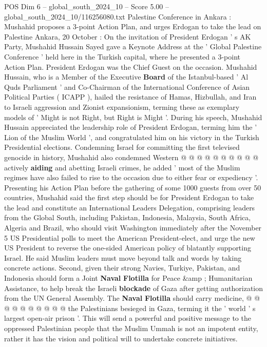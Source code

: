 \begin{textsample}{POS Dim 6 – global\_south\_2024\_10 – Score 5.00 – global\_south\_2024\_10/116256080.txt}  \label{ex:f6_pos_417}
Palestine Conference in Ankara : Mushahid proposes a 3-point Action Plan, and urges Erdogan to take the lead on Palestine Ankara, 20 October : On the invitation of President Erdogan ' s AK Party, Mushahid Hussain Sayed gave a Keynote Address at the ' Global Palestine Conference ' held here in the Turkish capital, where he presented a 3-point Action Plan.
President Erdogan was the Chief Guest on the occasion.
Mushahid Hussain, who is a Member of the Executive \textbf{Board} of the Istanbul-based ' Al Quds Parliament ' and Co-Chairman of the International Conference of Asian Political Parties ( ICAPP ), hailed the resistance of Hamas, Hizbullah, and Iran to Israeli aggression and Zionist expansionism, terming these as exemplary models of ' Might is not Right, but Right is Might '.
During his speech, Mushahid Hussain appreciated the leadership role of President Erdogan, terming him the ' Lion of the Muslim World ', and congratulated him on his victory in the Turkish Presidential elections.
Condemning Israel for committing the first televised genocide in history, Mushahid also condemned Western @ @ @ @ @ @ @ @ @ @ actively \textbf{aiding} and abetting Israeli crimes, he added ' most of the Muslim regimes have also failed to rise to the occasion due to either fear or expediency '.
Presenting his Action Plan before the gathering of some 1000 guests from over 50 countries, Mushahid said the first step should be for President Erdogan to take the lead and constitute an International Leaders Delegation, comprising leaders from the Global South, including Pakistan, Indonesia, Malaysia, South Africa, Algeria and Brazil, who should visit Washington immediately after the November 5 US Presidential polls to meet the American President-elect, and urge the new US President to reverse the one-sided American policy of blatantly supporting Israel.
He said Muslim leaders must move beyond talk and words by taking concrete actions.
Second, given their strong Navies, Turkiye, Pakistan, and Indonesia should form a Joint \textbf{Naval} \textbf{Flotilla} for Peace \&amp ; Humanitarian Assistance, to help break the Israeli \textbf{blockade} of Gaza after getting authorization from the UN General Assembly.
The \textbf{Naval} \textbf{Flotilla} should carry medicine, @ @ @ @ @ @ @ @ @ @ the Palestinians besieged in Gaza, terming it the ' world ' s largest open-air prison '.
This will send a powerful and positive message to the oppressed Palestinian people that the Muslim Ummah is not an impotent entity, rather it has the vision and political will to undertake concrete initiatives.

\end{textsample}
